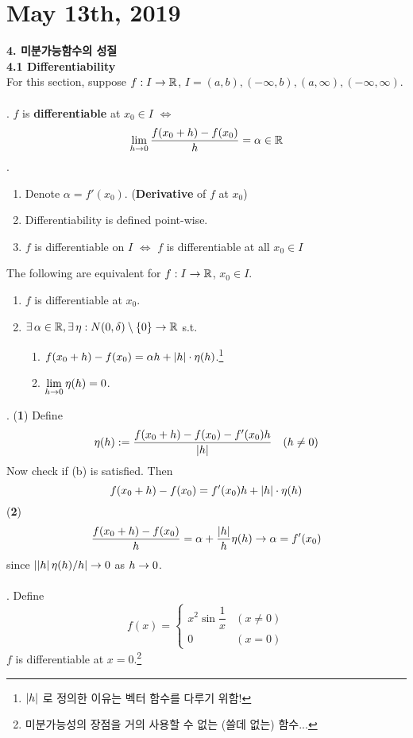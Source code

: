 \section*{May 13th, 2019}
\textbf{\large 4. 미분가능함수의 성질}\\
\textbf{4.1 Differentiability}\\
For this section, suppose $f: I \rightarrow \mathbb{R}$, $I = (a, b), (-\infty, b), (a, \infty), (-\infty,\infty )$.\\
\\
. $f$ is \textbf{differentiable} at $x_0 \in I$ $\iff$ $$\lim_{h\rightarrow 0} \frac{f(x_0 + h) - f(x_0)}{h} = \alpha \in \mathbb{R}$$
\rmk.
\begin{enumerate}
	\item Denote $\alpha = f'(x_0)$. (\textbf{Derivative} of $f$ at $x_0$)
	\item Differentiability is defined point-wise.
	\item $f$ is differentiable on $I$ $\iff$ $f$ is differentiable at all $x_0\in I$
\end{enumerate}
 The following are equivalent for $f:I\rightarrow \mathbb{R}$, $x_0\in I$.
\begin{enumerate}
	\item $f$ is differentiable at $x_0$.
	\item $\exists\,\alpha\in \mathbb{R}, \exists\,\eta : N(0, \delta) \setminus \{0\} \rightarrow \mathbb{R}$ s.t.
	\begin{enumerate}
		\item $f(x_0+h) - f(x_0) = \alpha h + \left|h\right|\cdot \eta(h)$.\footnote{$\left|h\right|$ 로 정의한 이유는 벡터 함수를 다루기 위함!}
		\item $\displaystyle \lim_{h\rightarrow 0} \eta(h) = 0$.
	\end{enumerate}
\end{enumerate}
\pf. (\textbf{1}) Define $$\eta(h) := \frac{f(x_0+h)-f(x_0) - f'(x_0)h}{\left|h\right|} \quad (h\neq 0)$$
Now check if (b) is satisfied. Then
$$f(x_0+h) - f(x_0) = f'(x_0) h + \left|h\right|\cdot \eta(h)$$
(\textbf{2}) $$\frac{f(x_0+h)-f(x_0)}{h} =\alpha + \frac{\left|h\right|}{h} \eta(h) \rightarrow \alpha = f'(x_0)$$
since $\left|\left|h\right| \eta(h)/h\right|\rightarrow 0$ as $h\rightarrow 0$.\\
\\
\ex. Define $$f(x) = \begin{cases}
	x^2\sin\dfrac{1}{x} & (x \neq 0)\\
	0 & (x= 0)
\end{cases}$$
$f$ is differentiable at $x = 0$.\footnote{미분가능성의 장점을 거의 사용할 수 없는 (쓸데 없는) 함수...}\\
